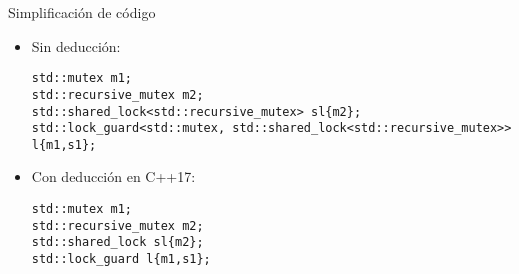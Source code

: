 \begin{frame}[t,fragile]{Simplificación de código}
\begin{itemize}
  \item Sin deducción:
\begin{lstlisting}
std::mutex m1;
std::recursive_mutex m2;
std::shared_lock<std::recursive_mutex> sl{m2};
std::lock_guard<std::mutex, std::shared_lock<std::recursive_mutex>> l{m1,s1};
\end{lstlisting}

  \vfill\pause
  \item Con deducción en C++17:
\begin{lstlisting}
std::mutex m1;
std::recursive_mutex m2;
std::shared_lock sl{m2};
std::lock_guard l{m1,s1};
\end{lstlisting}

\end{itemize}
\end{frame}

